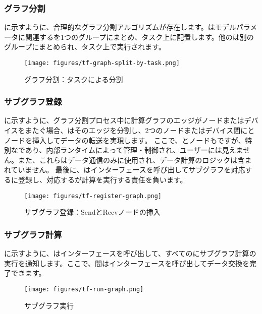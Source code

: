 \begin{content}
\subsubsection{グラフ分割}
に示すように、合理的なグラフ分割アルゴリズムが存在します。はモデルパラメータに関連するを1つのグループにまとめ、タスク上に配置します。他のは別のグループにまとめられ、タスク上で実行されます。
\begin{figure}[!htbp]
\centering
\texttt{[image: figures/tf-graph-split-by-task.png]}
\caption{グラフ分割：タスクによる分割}
\label{fig:tf-graph-split-by-task}
\end{figure}
\subsubsection{サブグラフ登録}
に示すように、グラフ分割プロセス中に計算グラフのエッジがノードまたはデバイスをまたぐ場合、はそのエッジを分割し、2つのノードまたはデバイス間にとノードを挿入してデータの転送を実現します。
ここで、とノードもですが、特別なであり、内部ランタイムによって管理・制御され、ユーザーには見えません。また、これらはデータ通信のみに使用され、データ計算のロジックは含まれていません。
最後に、はインターフェースを呼び出してサブグラフを対応するに登録し、対応するが計算を実行する責任を負います。
\begin{figure}[!htbp]
\centering
\texttt{[image: figures/tf-register-graph.png]}
\caption{サブグラフ登録：SendとRecvノードの挿入}
\label{fig:tf-register-graph}
\end{figure}
\subsubsection{サブグラフ計算}
に示すように、はインターフェースを呼び出して、すべてのにサブグラフ計算の実行を通知します。ここで、間はインターフェースを呼び出してデータ交換を完了できます。
\begin{figure}[!htbp]
\centering
\texttt{[image: figures/tf-run-graph.png]}
\caption{サブグラフ実行}
\label{fig:tf-run-graph}
\end{figure}
\end{content}
